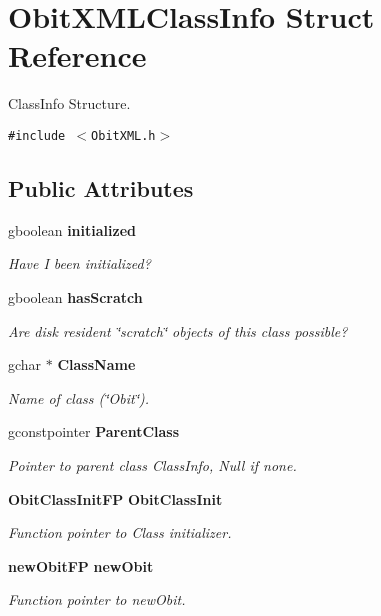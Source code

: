 \section{Obit\-XMLClass\-Info Struct Reference}
\label{structObitXMLClassInfo}
Class\-Info Structure.  


{\tt \#include $<$Obit\-XML.h$>$}

\subsection*{Public Attributes}
\begin{CompactItemize}
\item 
gboolean {\bf initialized}
\begin{CompactList}\small\item\em Have I been initialized? \item\end{CompactList}\item 
gboolean {\bf has\-Scratch}
\begin{CompactList}\small\item\em Are disk resident \char`\"{}scratch\char`\"{} objects of this class possible? \item\end{CompactList}\item 
gchar $\ast$ {\bf Class\-Name}
\begin{CompactList}\small\item\em Name of class (\char`\"{}Obit\char`\"{}). \item\end{CompactList}\item 
gconstpointer {\bf Parent\-Class}
\begin{CompactList}\small\item\em Pointer to parent class Class\-Info, Null if none. \item\end{CompactList}\item 
{\bf Obit\-Class\-Init\-FP} {\bf Obit\-Class\-Init}
\begin{CompactList}\small\item\em Function pointer to Class initializer. \item\end{CompactList}\item 
{\bf new\-Obit\-FP} {\bf new\-Obit}
\begin{CompactList}\small\item\em Function pointer to new\-Obit. \item\end{CompactList}\item 

\end{CompactItemize}
